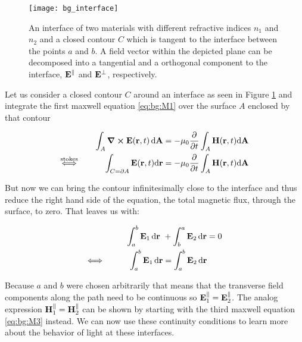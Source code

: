 \begin{figure}[H]
    \centering
    \texttt{[image: bg\_interface]}
    \caption{An interface of two materials with different refractive indices $n_1$ and $n_2$ and a closed contour $C$ which is tangent to the interface between the points $a$ and $b$. A field vector within the depicted plane can be decomposed into a tangential and a orthogonal component to the interface, 
    $\vb E^\parallel$ and $\vb E^\bot$, respectively.}
    \label{fig:bg:interface}
\end{figure}

Let us consider a closed contour $C$ around an interface as seen in Figure \ref{fig:bg:interface} and integrate the first maxwell equation \eqref{eq:bg:M1} over the surface $A$ enclosed by that contour

\begin{equation}
\begin{aligned}
    \int_A \curl \vb E(\vb r, t) \, \dd \vb A
    &= - \mu_0 \pdv t \int_A \vb H(\vb r, t) \dd \vb A\\
    \overset{\mathrm{stokes}}{\Longleftrightarrow} \hspace{3em}
    \int_{C = \partial A} \vb E(\vb r, t) \dd \vb r
    &= - \mu_0 \pdv t \int_A \vb H(\vb r, t) \dd \vb A\\
\end{aligned}
\end{equation}

But now we can bring the contour infinitesimally close to the interface and thus reduce the right hand side of the equation, the total magnetic flux, through the surface, to zero. That leaves us with:

\begin{equation}
\begin{aligned}
    \int_a^b \vb E_1 \, \dd \vb r \ &+ \int_b^a \vb E_2 \,  \dd \vb r = 0\\
    \Longleftrightarrow \hspace{3em}
    \int_a^b \vb E_1 \, \dd \vb r &= \int_a^b \vb E_2 \,  \dd \vb r \\
\end{aligned}
\end{equation}

Because $a$ and $b$ were chosen arbitrarily that means that the transverse field components along the path need to be continuous so
$\vb E_1^{\parallel} = \vb E_2^{\parallel}$.
The analog expression
$\vb H_1^{\parallel} = \vb H_2^{\parallel}$
can be shown by starting with the third maxwell equation \eqref{eq:bg:M3} instead. We can now use these continuity conditions to learn more about the behavior of light at these interfaces.

